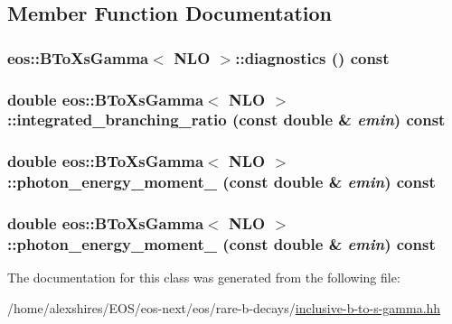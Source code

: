 \subsection{Member Function Documentation}
\hypertarget{classeos_1_1BToXsGamma_3_01NLO_01_4_af39756d6216354324d53d410a3b11949}{
\subsubsection[{diagnostics}]{ eos::BToXsGamma$<$ {\bf NLO} $>$::diagnostics () const}}
\label{classeos_1_1BToXsGamma_3_01NLO_01_4_af39756d6216354324d53d410a3b11949}
\hypertarget{classeos_1_1BToXsGamma_3_01NLO_01_4_ae00900386a68e7b65880ccb8145203fb}{
\subsubsection[{integrated\_\-branching\_\-ratio}]{\setlength{\rightskip}{0pt plus 5cm}double eos::BToXsGamma$<$ {\bf NLO} $>$::integrated\_\-branching\_\-ratio (const double \& {\em emin}) const}}
\label{classeos_1_1BToXsGamma_3_01NLO_01_4_ae00900386a68e7b65880ccb8145203fb}
\hypertarget{classeos_1_1BToXsGamma_3_01NLO_01_4_ae72d7476e5a0e0184bb4b3d355509251}{
\subsubsection[{photon\_\-energy\_\-moment\_\-1}]{\setlength{\rightskip}{0pt plus 5cm}double eos::BToXsGamma$<$ {\bf NLO} $>$::photon\_\-energy\_\-moment\_ (const double \& {\em emin}) const}}
\label{classeos_1_1BToXsGamma_3_01NLO_01_4_ae72d7476e5a0e0184bb4b3d355509251}
\hypertarget{classeos_1_1BToXsGamma_3_01NLO_01_4_a0db4100d9dc7e9678ecc73a0c5c8e591}{
\subsubsection[{photon\_\-energy\_\-moment\_\-2}]{\setlength{\rightskip}{0pt plus 5cm}double eos::BToXsGamma$<$ {\bf NLO} $>$::photon\_\-energy\_\-moment\_ (const double \& {\em emin}) const}}
\label{classeos_1_1BToXsGamma_3_01NLO_01_4_a0db4100d9dc7e9678ecc73a0c5c8e591}


The documentation for this class was generated from the following file:\begin{DoxyCompactItemize}
\item 
/home/alexshires/EOS/eos-\/next/eos/rare-\/b-\/decays/\hyperlink{inclusive-b-to-s-gamma_8hh}{inclusive-\/b-\/to-\/s-\/gamma.hh}\end{DoxyCompactItemize}
